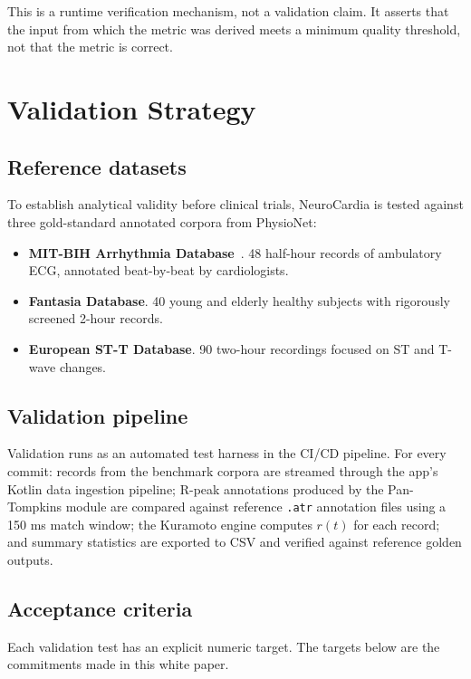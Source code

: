 \documentclass[11pt]{article}
\begin{document}
This is a runtime verification mechanism, not a validation claim. It
asserts that the input from which the metric was derived meets a
minimum quality threshold, not that the metric is correct.

\section{Validation Strategy}\label{sec:validation}

\subsection{Reference datasets}

To establish analytical validity before clinical trials, NeuroCardia is
tested against three gold-standard annotated corpora from PhysioNet:

\begin{itemize}
\item \textbf{MIT-BIH Arrhythmia Database}~\cite{mitdb}. 48 half-hour
records of ambulatory ECG, annotated beat-by-beat by cardiologists.
\item \textbf{Fantasia Database}. 40 young and elderly healthy subjects
with rigorously screened 2-hour records.
\item \textbf{European ST-T Database}. 90 two-hour recordings focused on
ST and T-wave changes.
\end{itemize}

\subsection{Validation pipeline}

Validation runs as an automated test harness in the CI/CD pipeline. For
every commit: records from the benchmark corpora are streamed through
the app's Kotlin data ingestion pipeline; R-peak annotations produced
by the Pan-Tompkins module are compared against reference
\texttt{.atr} annotation files using a 150 ms match window; the
Kuramoto engine computes $r(t)$ for each record; and summary statistics
are exported to CSV and verified against reference golden outputs.

\subsection{Acceptance criteria}

Each validation test has an explicit numeric target. The targets below
are the commitments made in this white paper.
\end{document}
